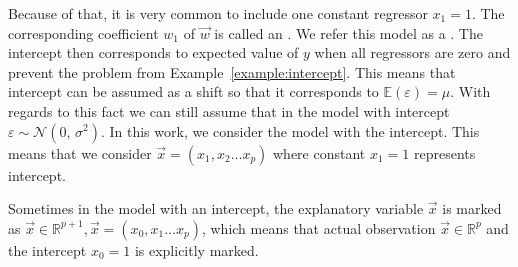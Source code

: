 Because of that, it is very common to include one constant regressor $x_1 = 1$. The corresponding coefficient $w_1$ of $\vec{w}$ is called an . We refer this model as a . The intercept then corresponds to expected value of $y$ when all regressors are zero and prevent the problem from Example~\ref{example:intercept}. This means that intercept can be assumed as a shift so that it corresponds to $\mathbb{E}(\varepsilon) = \mu$. With regards to this fact we can still assume that in the model with intercept $\varepsilon \sim \mathcal{N}(0,\,\sigma^{2})$.
In this work, we consider the model with the intercept. This means that we consider $\vec{x} = (x_1, x_2 \ldots x_p)$ where constant $x_1 = 1$ represents intercept.  
\begin{note}
Sometimes in the model with an intercept, the explanatory variable $\vec{x}$  is marked as $\vec{x} \in \mathbb{R}^{p+1}, \vec{x} = (x_0, x_1 \ldots x_p)$, 
which means that actual observation $\vec{x} \in \mathbb{R}^p$ and the intercept $x_0 = 1$ is explicitly marked.
\end{note} 



